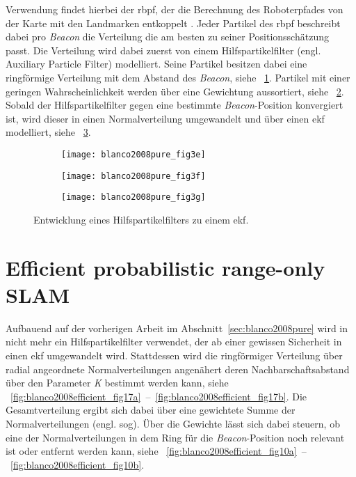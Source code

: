 Verwendung findet hierbei der \Gls{rbpf}, der die Berechnung des Roboterpfades von der Karte mit den Landmarken entkoppelt \cite{murphy2001rao, montemerlo2002fastslam}. Jeder Partikel des \Gls{rbpf} beschreibt dabei pro \textit{Beacon} die Verteilung die am besten zu seiner Positionsschätzung passt. Die Verteilung wird dabei zuerst von einem Hilfspartikelfilter (engl. Auxiliary Particle Filter) modelliert. Seine Partikel besitzen dabei eine ringförmige Verteilung mit dem Abstand des \textit{Beacon}, siehe \figurename~\ref{fig:blanco2008pure_fig3e}. Partikel mit einer geringen Wahrscheinlichkeit werden über eine Gewichtung aussortiert, siehe \figurename~\ref{fig:blanco2008pure_fig3f}. Sobald der Hilfspartikelfilter gegen eine bestimmte \textit{Beacon}-Position konvergiert ist, wird dieser in einen Normalverteilung umgewandelt und über einen \Gls{ekf} modelliert, siehe \figurename~\ref{fig:blanco2008pure_fig3g}.

\begin{figure}
	\begin{subfigure}[t]{0.3\linewidth}
		\texttt{[image: blanco2008pure\_fig3e]}
		\caption{}
		\label{fig:blanco2008pure_fig3e}
	\end{subfigure}
	\hfill
	\begin{subfigure}[t]{0.3\linewidth}
		\texttt{[image: blanco2008pure\_fig3f]}
		\caption{}
		\label{fig:blanco2008pure_fig3f}
	\end{subfigure}
	\hfill
	\begin{subfigure}[t]{0.3\linewidth}
		\texttt{[image: blanco2008pure\_fig3g]}
		\caption{}
		\label{fig:blanco2008pure_fig3g}
	\end{subfigure}
	\caption{Entwicklung eines Hilfspartikelfilters zu einem \Gls{ekf}.}
	\label{fig:blanco2008pure_fig3}
\end{figure}


%
%
\section{Efficient probabilistic range-only SLAM}\label{sec:blanco2008efficient}

Aufbauend auf der vorherigen Arbeit im Abschnitt~\ref{sec:blanco2008pure} wird in  \cite{blanco2008efficient} nicht mehr ein Hilfspartikelfilter verwendet, der ab einer gewissen Sicherheit in einen \Gls{ekf} umgewandelt wird. Stattdessen wird die ringförmiger Verteilung über radial angeordnete Normalverteilungen angenähert deren Nachbarschaftsabstand über den Parameter \textit{K} bestimmt werden kann, siehe \figurename~\ref{fig:blanco2008efficient_fig17a}~--~\ref{fig:blanco2008efficient_fig17b}. Die Gesamtverteilung ergibt sich dabei über eine gewichtete Summe der Normalverteilungen (engl. \gls{sog}). Über die Gewichte lässt sich dabei steuern, ob eine der Normalverteilungen in dem Ring für die \textit{Beacon}-Position noch relevant ist oder entfernt werden kann, siehe \figurename~\ref{fig:blanco2008efficient_fig10a}~--~\ref{fig:blanco2008efficient_fig10b}.

